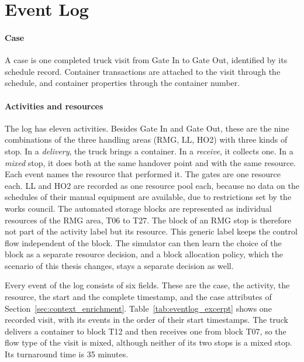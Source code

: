 \section{Event Log}
\label{sec:event_log_engineering}

\paragraph{Case}
\label{sec:visit_reconstruction}
A case is one completed truck visit from Gate In to Gate Out, identified by its
schedule record. Container transactions are attached to the visit through the
schedule, and container properties through the container number.

\paragraph{Activities and resources}
\label{sec:activities_order}
\label{sec:resource_identities}
The log has eleven activities. Besides Gate In and Gate Out, these are the nine
combinations of the three handling areas (RMG, LL, HO2) with three kinds of stop. In a
\emph{delivery}, the truck brings a container. In a \emph{receive}, it collects
one. In a \emph{mixed} stop, it does both at the same handover point and with the
same resource. Each event names the resource that performed it. The gates are one
resource each. LL and HO2 are recorded as one resource pool each, because no data
on the schedules of their manual equipment are available, due to restrictions set
by the works council. The automated storage blocks are represented as individual
resources of the RMG area, T06 to T27. The block of an RMG stop is therefore not
part of the activity label but its resource. This generic label keeps the control
flow independent of the block. The simulator can then learn the choice of the
block as a separate resource decision, and a block allocation policy, which the
scenario of this thesis changes, stays a separate decision as well.

Every event of the log consists of six fields. These are the case, the activity,
the resource, the start and the complete timestamp, and the case attributes of
Section~\ref{sec:context_enrichment}. Table~\ref{tab:eventlog_excerpt} shows one
recorded visit, with its events in the order of their start timestamps. The truck
delivers a container to block T12 and then receives one from block T07, so the
flow type of the visit is mixed, although neither of its two stops is a mixed stop. Its turnaround time is 35 minutes.

